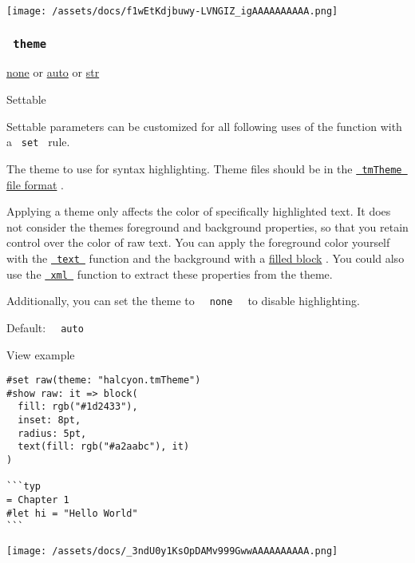 \texttt{[image: /assets/docs/f1wEtKdjbuwy-LVNGIZ\_igAAAAAAAAAA.png]}

\subsubsection{\texorpdfstring{\texttt{\ theme\ }}{ theme }}\label{parameters-theme}

\href{/docs/reference/foundations/none/}{none} {or}
\href{/docs/reference/foundations/auto/}{auto} {or}
\href{/docs/reference/foundations/str/}{str}

{{ Settable }}

\label{parameters-theme-settable-tooltip}
Settable parameters can be customized for all following uses of the
function with a \texttt{\ set\ } rule.

The theme to use for syntax highlighting. Theme files should be in the
\href{https://www.sublimetext.com/docs/color_schemes_tmtheme.html}{\texttt{\ tmTheme\ }
file format} .

Applying a theme only affects the color of specifically highlighted
text. It does not consider the theme\textquotesingle s foreground and
background properties, so that you retain control over the color of raw
text. You can apply the foreground color yourself with the
\href{/docs/reference/text/text/}{\texttt{\ text\ }} function and the
background with a
\href{/docs/reference/layout/block/\#parameters-fill}{filled block} .
You could also use the
\href{/docs/reference/data-loading/xml/}{\texttt{\ xml\ }} function to
extract these properties from the theme.

Additionally, you can set the theme to
\texttt{\ }{\texttt{\ none\ }}\texttt{\ } to disable highlighting.

Default: \texttt{\ }{\texttt{\ auto\ }}\texttt{\ }


View example

\begin{verbatim}
#set raw(theme: "halcyon.tmTheme")
#show raw: it => block(
  fill: rgb("#1d2433"),
  inset: 8pt,
  radius: 5pt,
  text(fill: rgb("#a2aabc"), it)
)

```typ
= Chapter 1
#let hi = "Hello World"
```
\end{verbatim}

\texttt{[image: /assets/docs/\_3ndU0y1KsOpDAMv999GwwAAAAAAAAAA.png]}


